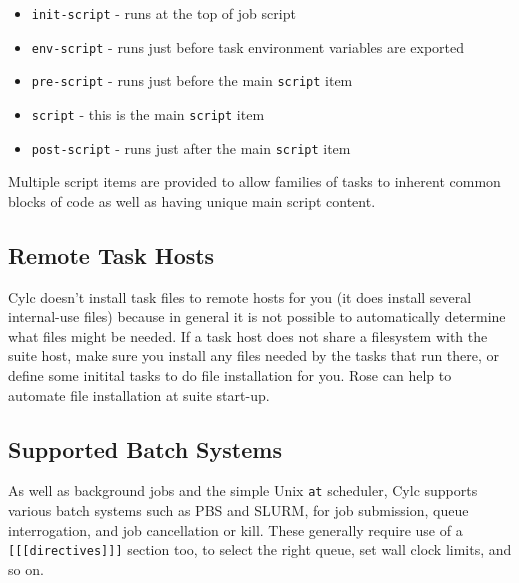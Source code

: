 \begin{itemize}
    \item \lstinline=init-script= - runs at the top of job script
    \item \lstinline=env-script= - runs just before task environment variables are exported
    \item \lstinline=pre-script= - runs just before the main \lstinline=script= item
    \item \lstinline=script= - this is the main \lstinline=script= item
    \item \lstinline=post-script= - runs just after the main \lstinline=script= item
\end{itemize}

Multiple script items are provided to allow families of tasks to inherent common
blocks of code as well as having unique main script content.

\subsection{Remote Task Hosts}

Cylc doesn't install task files to remote hosts for you (it does install several
internal-use files) because in general it is not
possible to automatically determine what files might be needed. If a task host
does not share a filesystem with the suite host, make sure you install any
files needed by the tasks that run there, or define some initital tasks to do
file installation for you.  Rose can help to automate file installation at
suite start-up.

\subsection{Supported Batch Systems}

As well as background jobs and the simple Unix \lstinline=at= scheduler, Cylc
supports various batch systems such as PBS and SLURM, for job submission,
queue interrogation, and job cancellation or kill. These generally require use
of a \lstinline=[[[directives]]]= section too, to select the right queue, set
wall clock limits, and so on.


